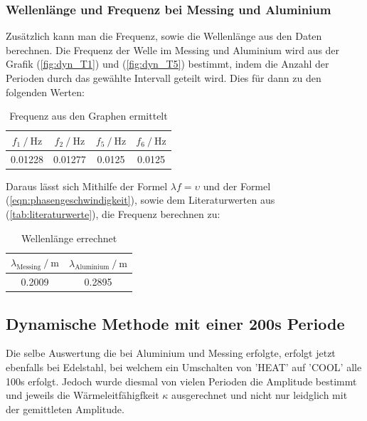 \noindent
\newpage
\subsubsection{Wellenlänge und Frequenz bei Messing und Aluminium}
    Zusätzlich kann man die Frequenz, sowie die Wellenlänge aus den Daten berechnen. Die Frequenz der Welle im Messing und Aluminium wird aus der Grafik (\ref{fig:dyn_T1}) und (\ref{fig:dyn_T5}) bestimmt, indem die Anzahl der Perioden durch das gewählte Intervall geteilt wird.
    Dies für dann zu den folgenden Werten:
    \begin{table}
        \centering
            \begin{tabular}{c c c c}
            \toprule
            {$   f_1 \mathbin{/}\si{\hertz} $}
            & {$ f_2 \mathbin{/} \si{\hertz} $}
            & {$ f_5 \mathbin{/} \si{\hertz} $}
            & {$ f_6 \mathbin{/} \si{\hertz} $} \\
            \midrule
            0.01228 & 0.01277 & 0.0125 & 0.0125\\
            \bottomrule
            \end{tabular}
        \caption{Frequenz aus den Graphen ermittelt}
        \label{tab:MesWelle}
    \end{table}

\noindent  
    Daraus lässt sich Mithilfe der Formel $\lambda f = \upsilon$ und der Formel (\ref{eqn:phasengeschwindigkeit}), sowie dem Literaturwerten aus (\ref{tab:literaturwerte}), die Frequenz berechnen zu:
\begin{table}
        \centering
            \begin{tabular}{c c}
            \toprule
            {$   \lambda_\text{Messing} \mathbin{/} \si{\meter} $}
            & {$ \lambda_\text{Aluminium} \mathbin{/} \si{\meter} $} \\
            \midrule
            0.2009 & 0.2895 \\
            \bottomrule
            \end{tabular}
        \caption{Wellenlänge errechnet}
        \label{tab:MesWelle}
    \end{table}


    \subsection{Dynamische Methode mit einer 200s Periode}
    
\noindent
    Die selbe Auswertung die bei Aluminium und Messing erfolgte, erfolgt jetzt ebenfalls bei Edelstahl, bei welchem ein Umschalten von 'HEAT' auf 'COOL' alle 100s erfolgt. Jedoch wurde diesmal von vielen Perioden die Amplitude bestimmt und jeweils die Wärmeleitfähigfkeit $\kappa$ ausgerechnet und nicht nur leidglich mit der gemittleten Amplitude.
    
